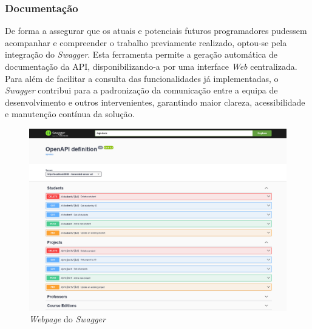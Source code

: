 \subsubsection{Documentação}

De forma a assegurar que os atuais e potenciais futuros programadores pudessem acompanhar e compreender o trabalho previamente realizado, optou-se pela integração do \textit{Swagger}. Esta ferramenta permite a geração automática de documentação da API, disponibilizando-a por uma interface \textit{Web} centralizada. Para além de facilitar a consulta das funcionalidades já implementadas, o \textit{Swagger} contribui para a padronização da comunicação entre a equipa de desenvolvimento e outros intervenientes, garantindo maior clareza, acessibilidade e manutenção contínua da solução.

\begin{figure}[h!tbp]
    \centering
    \includegraphics[width=\linewidth]{capitulos/cap4-implementacao/assets/swagger-homepage.png}
    \caption{\textit{Webpage} do \textit{Swagger}}
\end{figure}